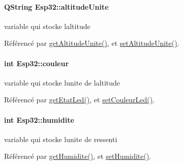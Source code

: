 \paragraph[{\texorpdfstring{altitude\+Unite}{altitudeUnite}}]{\setlength{\rightskip}{0pt plus 5cm}Q\+String Esp32\+::altitude\+Unite\hspace{0.3cm}{\ttfamily [private]}}\hypertarget{class_esp32_ad407a4a4139183be7c4293fb254c96d7}{}\label{class_esp32_ad407a4a4139183be7c4293fb254c96d7}
variable qui stocke l\textquotesingle{}altitude 

Référencé par \hyperlink{class_esp32_aad3c2e4b5d15a02abc62d0329f43942d}{get\+Altitude\+Unite()}, et \hyperlink{class_esp32_a69b0c6a1c0a31e043b715be3fc40ded1}{set\+Altitude\+Unite()}.

\paragraph[{\texorpdfstring{couleur}{couleur}}]{\setlength{\rightskip}{0pt plus 5cm}int Esp32\+::couleur\hspace{0.3cm}{\ttfamily [private]}}\hypertarget{class_esp32_ae8f6b2080769949ae5bd41c8312a6892}{}\label{class_esp32_ae8f6b2080769949ae5bd41c8312a6892}
variable qui stocke l\textquotesingle{}unite de l\textquotesingle{}altitude 

Référencé par \hyperlink{class_esp32_ac695656654b5d83ec3924b47f533f465}{get\+Etat\+Led()}, et \hyperlink{class_esp32_a32d0d1abb41a3762a54e9f5a33b3b247}{set\+Couleur\+Led()}.

\paragraph[{\texorpdfstring{humidite}{humidite}}]{\setlength{\rightskip}{0pt plus 5cm}int Esp32\+::humidite\hspace{0.3cm}{\ttfamily [private]}}\hypertarget{class_esp32_a7ad1a81c0a3cb29035aaef89d153f662}{}\label{class_esp32_a7ad1a81c0a3cb29035aaef89d153f662}
variable qui stocke l\textquotesingle{}unite de ressenti 

Référencé par \hyperlink{class_esp32_a87f581ef8f01bcb71a7294cc545b242e}{get\+Humidite()}, et \hyperlink{class_esp32_a029c94bf405887eb890b3381ac176a9a}{set\+Humidite()}.

